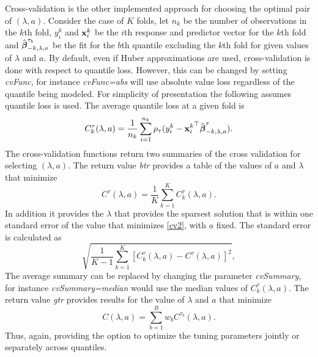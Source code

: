 \documentclass[article]{rqPenVignette}%
\newcommand{\vx}{{\bf x}}
\newcommand{\vbeta}{\mbox{\boldmath $\beta$}}
\begin{document}
Cross-validation is the other implemented approach for choosing the optimal pair of $(\lambda,a)$. Consider the case of $K$ folds, let $n_k$ be the number of observations in the $k$th fold, $y_i^k$ and $\vx_i^k$ be the $i$th response and predictor vector for the $k$th fold and $\hat{\vbeta}^{\tau_b}_{-k,\lambda,a}$ be the fit for the $b$th quantile excluding the $k$th fold for given values of $\lambda$ and $a$. By default, even if Huber approximations are used, cross-validation is done with respect to quantile loss. However, this can be changed by setting \emph{cvFunc}, for instance \emph{cvFunc=abs} will use absolute value loss regardless of the quantile being modeled. For simplicity of presentation the following assumes quantile loss is used. The average quantile loss at a given fold is 
\begin{equation}
\label{cv1}
C_k^\tau(\lambda,a) = \frac{1}{n_k} \sum_{i=1}^{n_k} \rho_\tau(y_i^k-{\vx_i^k}^\top\hat{\vbeta}^{\tau}_{-k,\lambda,a}).
\end{equation}
The cross-validation functions return two summaries of the cross validation for selecting $(\lambda,a)$. The return value \emph{btr} provides a table of the values of $a$ and $\lambda$ that minimize 
\begin{equation}
\label{cv2}
C^\tau(\lambda,a) = \frac{1}{K} \sum_{k=1}^K C_k^\tau(\lambda,a).
\end{equation}
In addition it provides the $\lambda$ that provides the sparsest solution that is within one standard error of the value that minimizes \eqref{cv2}, with $a$ fixed. The standard error is calculated as 
\begin{equation}
\sqrt{\frac{1}{K-1} \sum_{k=1}^K \left[C_k^\tau(\lambda,a)-C^\tau(\lambda,a) \right]^2},
\end{equation}
The average summary can be replaced by changing the parameter \emph{cvSummary}, for instance \emph{cvSummary=median} would use the median values of $C_k^\tau(\lambda,a)$. The return value \emph{gtr} provides results for the value of $\lambda$ and $a$ that minimize
\begin{equation}
\label{cv3}
C(\lambda,a) = \sum_{b=1}^B w_b C^{\tau_b}(\lambda,a).
\end{equation}
Thus, again, providing the option to optimize the tuning parameters jointly or separately across quantiles. %
\end{document}
